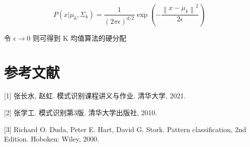 \documentclass[openany,a4paper,12pt]{ctexbook}
\theoremstyle{kaiti}
\theoremstyle{normal}
\begin{document}
\begin{equation}
  P\left(x|\mu_k,\Sigma_k \right)=\frac{1}{\left(2\pi \epsilon \right)^{d/2}}\exp \left(-\frac{\left\| x-\mu_k \right\|^2}{2\epsilon}\right)
\end{equation}

令 $\epsilon \rightarrow 0$ 则可得到 K 均值算法的硬分配

\backmatter
\chapter{参考文献}

[1] 张长水, 赵虹. 模式识别课程讲义与作业. 清华大学, 2021.

[2] 张学工. 模式识别第3版. 清华大学出版社, 2010.

[3] Richard O. Duda, Peter E. Hart, David G. Stork. Pattern classification, 2nd Edition. Hoboken: Wiley, 2000.
\end{document}

